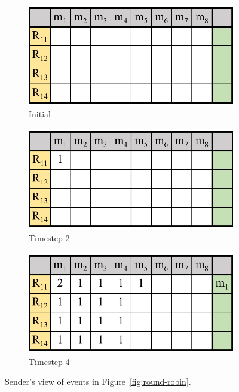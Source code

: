 \begin{figure}[t]
    \centering
    \begin{subfigure}[b]{0.32\columnwidth}
         \centering
         \includegraphics[width=\textwidth]{quack1.pdf}
         \caption{Initial}
         \label{sfig:init-ack}
     \end{subfigure}
     \begin{subfigure}[b]{0.32\columnwidth}
         \centering
         \includegraphics[width=\textwidth]{quack2.pdf}
         \caption{Timestep 2}
         \label{sfig:first-ack}
     \end{subfigure}
     \begin{subfigure}[b]{0.32\columnwidth}
         \centering
         \includegraphics[width=\textwidth]{quack3.pdf}
         \caption{Timestep 4}
         \label{sfig:second-ack}
     \end{subfigure}
    \caption{Sender's view of events in Figure~\ref{fig:round-robin}.}
    \label{fig:quack-counter}
\end{figure}

